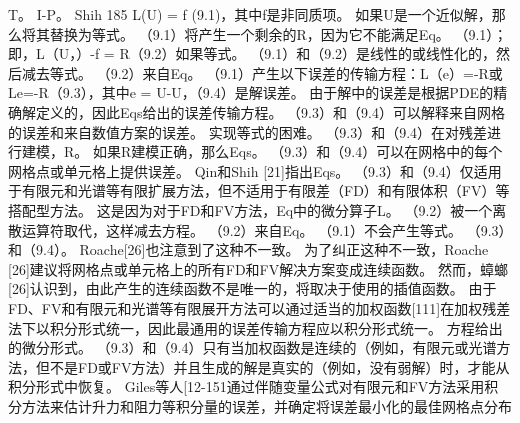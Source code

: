 \documentclass[UTF8,11pt,a4paper,openany,fontset=fandol]{ctexbook}
\begin{document}
T。 I-P。 Shih 185 L(U) = f (9.1)，其中f是非同质项。 如果U是一个近似解，那么将其替换为等式。 （9.1）将产生一个剩余的R，因为它不能满足Eq。 （9.1）；即，L（U，）-f = R（9.2）如果等式。 （9.1）和（9.2）是线性的或线性化的，然后减去等式。 （9.2）来自Eq。 （9.1）产生以下误差的传输方程：L（e）=-R或Le=-R（9.3），其中e = U-U，（9.4）是解误差。 由于解中的误差是根据PDE的精确解定义的，因此Eqs给出的误差传输方程。 （9.3）和（9.4）可以解释来自网格的误差和来自数值方案的误差。 实现等式的困难。 （9.3）和（9.4）在对残差进行建模，R。 如果R建模正确，那么Eqs。 （9.3）和（9.4）可以在网格中的每个网格点或单元格上提供误差。 Qin和Shih [21]指出Eqs。 （9.3）和（9.4）仅适用于有限元和光谱等有限扩展方法，但不适用于有限差（FD）和有限体积（FV）等搭配型方法。 这是因为对于FD和FV方法，Eq中的微分算子L。 （9.2）被一个离散运算符取代，这样减去方程。 （9.2）来自Eq。 （9.1）不会产生等式。 （9.3）和（9.4）。 Roache[26]也注意到了这种不一致。 为了纠正这种不一致，Roache [26]建议将网格点或单元格上的所有FD和FV解决方案变成连续函数。 然而，蟑螂[26]认识到，由此产生的连续函数不是唯一的，将取决于使用的插值函数。 由于FD、FV和有限元和光谱等有限展开方法可以通过适当的加权函数[111]在加权残差法下以积分形式统一，因此最通用的误差传输方程应以积分形式统一。 方程给出的微分形式。 （9.3）和（9.4）只有当加权函数是连续的（例如，有限元或光谱方法，但不是FD或FV方法）并且生成的解是真实的（例如，没有弱解）时，才能从积分形式中恢复。 Giles等人[12-151通过伴随变量公式对有限元和FV方法采用积分方法来估计升力和阻力等积分量的误差，并确定将误差最小化的最佳网格点分布
\end{document}
